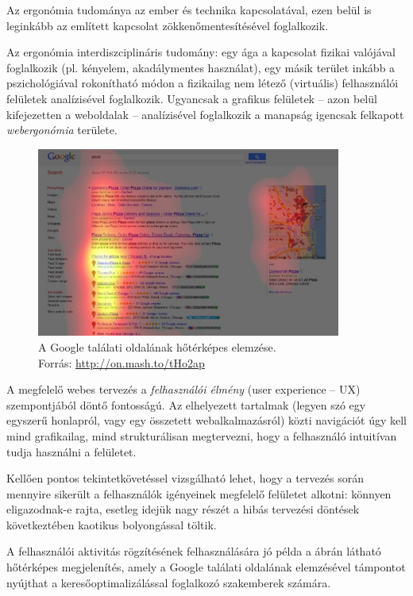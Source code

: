 Az ergonómia tudománya az ember és technika kapcsolatával, ezen belül is leginkább az említett kapcsolat zökkenőmentesítésével foglalkozik. 

Az ergonómia interdiszciplináris tudomány: egy ága a kapcsolat fizikai valójával foglalkozik (pl. kényelem, akadálymentes használat), egy másik terület inkább a pszichológiával rokonítható módon a fizikailag nem létező (virtuális) felhasználói felületek analízisével foglalkozik. Ugyancsak a grafikus felületek -- azon belül kifejezetten a weboldalak -- analízisével foglalkozik a manapság igencsak felkapott \emph{webergonómia} területe.

\begin{figure}[!ht]
\centering
\includegraphics[width=100mm, keepaspectratio]{figures/google_heatmap.png}
\caption{A Google találati oldalának hőtérképes elemzése.\\Forrás: \url{http://on.mash.to/tHo2ap}}
\label{fig:google_heatmap}
\end{figure}

A megfelelő webes tervezés a \emph{felhasználói élmény} (user experience -- UX) szempontjából döntő fontosságú. Az elhelyezett tartalmak (legyen szó egy egyszerű honlapról, vagy egy összetett webalkalmazásról) közti navigációt úgy kell mind grafikailag, mind strukturálisan megtervezni, hogy a felhasználó intuitívan tudja használni a felületet.

Kellően pontos tekintetkövetéssel vizsgálható lehet, hogy a tervezés során mennyire sikerült a felhasználók igényeinek megfelelő felületet alkotni: könnyen eligazodnak-e rajta, esetleg idejük nagy részét a hibás tervezési döntések következtében kaotikus bolyongással töltik.

A felhasználói aktivitás rögzítésének felhasználására jó példa a  ábrán látható hőtérképes megjelenítés, amely a Google találati oldalának elemzésével támpontot nyújthat a keresőoptimalizálással foglalkozó szakemberek számára.

